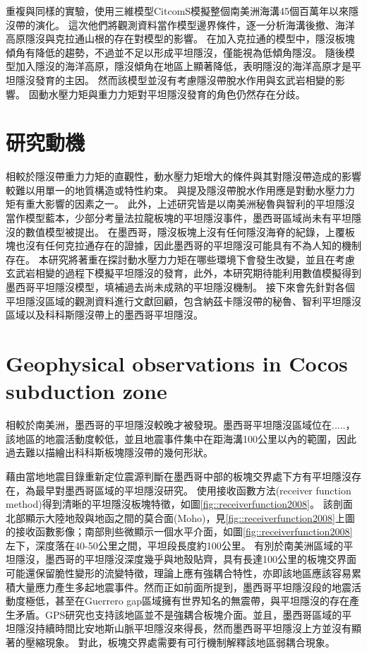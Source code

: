 \citealp{Hu2016}重複與\citealp{Manea2012Chile}同樣的實驗，使用三維模型CitcomS模擬整個南美洲海溝45個百萬年以來隱沒帶的演化。
這次他們將觀測資料當作模型邊界條件，逐一分析海溝後撤、海洋高原隱沒與克拉通山根的存在對模型的影響。
在加入克拉通的模型中，隱沒板塊傾角有降低的趨勢，不過並不足以形成平坦隱沒，僅能視為低傾角隱沒。
隨後模型加入隱沒的海洋高原，隱沒傾角在地區上顯著降低，表明隱沒的海洋高原才是平坦隱沒發育的主因。
然而該模型並沒有考慮隱沒帶脫水作用與玄武岩相變的影響。
固動水壓力矩與重力力矩對平坦隱沒發育的角色仍然存在分歧。

\section{研究動機}
相較於隱沒帶重力力矩的直觀性，動水壓力矩增大的條件與其對隱沒帶造成的影響較難以用單一的地質構造或特性約束。
\citealp{Manea2017}與\citealp{Yan2020}提及隱沒帶脫水作用應是對動水壓力力矩有重大影響的因素之一。
此外，上述研究皆是以南美洲秘魯與智利的平坦隱沒當作模型藍本，少部分考量法拉龍板塊的平坦隱沒事件，墨西哥區域尚未有平坦隱沒的數值模型被提出。
在墨西哥，隱沒板塊上沒有任何隱沒海脊的紀錄，上覆板塊也沒有任何克拉通存在的證據，因此墨西哥的平坦隱沒可能具有不為人知的機制存在。
本研究將著重在探討動水壓力力矩在哪些環境下會發生改變，並且在考慮玄武岩相變的過程下模擬平坦隱沒的發育，此外，本研究期待能利用數值模擬得到墨西哥平坦隱沒模型，填補過去尚未成熟的平坦隱沒機制。
接下來會先針對各個平坦隱沒區域的觀測資料進行文獻回顧，包含納茲卡隱沒帶的秘魯、智利平坦隱沒區域以及科科斯隱沒帶上的墨西哥平坦隱沒。

\section{Geophysical observations in Cocos subduction zone}
相較於南美洲，墨西哥的平坦隱沒較晚才被發現。墨西哥平坦隱沒區域位在.....，該地區的地震活動度較低，並且地震事件集中在距海溝100公里以內的範圍，因此過去難以描繪出科科斯板塊隱沒帶的幾何形狀。

\citealp{pardo1995}藉由當地地震目錄重新定位震源判斷在墨西哥中部的板塊交界處下方有平坦隱沒存在，為最早對墨西哥區域的平坦隱沒研究。
\citealp{PerezCampos2008}使用接收函數方法(receiver function method)得到清晰的平坦隱沒板塊特徵，如圖\ref{fig::receiverfunction2008}。
該剖面北部顯示大陸地殼與地函之間的莫合面(Moho)，見\ref{fig::receiverfunction2008}上圖的接收函數影像；南部則些微顯示一個水平介面，如圖\ref{fig::receiverfunction2008}左下，深度落在40-50公里之間，平坦段長度約100公里。
有別於南美洲區域的平坦隱沒，墨西哥的平坦隱沒深度幾乎與地殼貼齊，具有長達100公里的板塊交界面可能還保留脆性變形的流變特徵，理論上應有強耦合特性，亦即該地區應該容易累積大量應力產生多起地震事件。然而正如前面所提到，墨西哥平坦隱沒段的地震活動度極低，甚至在Guerrero gap區域擁有世界知名的無震帶，與平坦隱沒的存在產生矛盾。GPS研究也支持該地區並不是強耦合板塊介面。並且，墨西哥區域的平坦隱沒持續時間比安地斯山脈平坦隱沒來得長，然而墨西哥平坦隱沒上方並沒有顯著的壓縮現象。
對此，板塊交界處需要有可行機制解釋該地區弱耦合現象。

